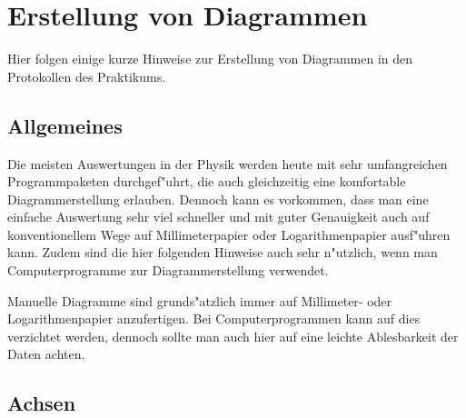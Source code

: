 
\chapter {Erstellung von Diagrammen} \label{v:diagramme}

Hier folgen einige kurze Hinweise zur Erstellung von Diagrammen in
den Protokollen des Praktikums.

\section{Allgemeines}

Die meisten Auswertungen in der Physik werden heute mit sehr
umfangreichen Programmpaketen durchgef"uhrt, die auch gleichzeitig
eine komfortable Diagrammerstellung erlauben. Dennoch kann es
vorkommen, dass man eine einfache Auswertung sehr viel schneller
und mit guter Genauigkeit auch auf konventionellem Wege auf
Millimeterpapier oder Logarithmenpapier ausf"uhren kann. Zudem sind
die hier folgenden Hinweise auch sehr n"utzlich, wenn man
Computerprogramme zur Diagrammerstellung verwendet.

Manuelle Diagramme sind grunds"atzlich immer auf Millimeter- oder
Logarithmenpapier anzufertigen. Bei Computerprogrammen kann auf dies
verzichtet werden, dennoch sollte man auch hier auf eine leichte
Ablesbarkeit der Daten achten.

\section{Achsen}


